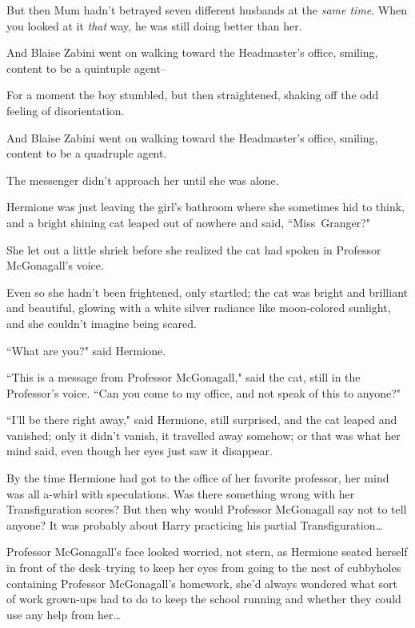 But then Mum hadn't betrayed seven different husbands at the \emph{same time}. When you looked at it \emph{that} way, he was still doing better than her.

And Blaise Zabini went on walking toward the Headmaster's office, smiling, content to be a quintuple agent\---

For a moment the boy stumbled, but then straightened, shaking off the odd feeling of disorientation.

And Blaise Zabini went on walking toward the Headmaster's office, smiling, content to be a quadruple agent.


The messenger didn't approach her until she was alone.

Hermione was just leaving the girl's bathroom where she sometimes hid to think, and a bright shining cat leaped out of nowhere and said, ``Miss~Granger?"

She let out a little shriek before she realized the cat had spoken in Professor McGonagall's voice.

Even so she hadn't been frightened, only startled; the cat was bright and brilliant and beautiful, glowing with a white silver radiance like moon-colored sunlight, and she couldn't imagine being scared.

``What are you?" said Hermione.

``This is a message from Professor McGonagall," said the cat, still in the Professor's voice. ``Can you come to my office, and not speak of this to anyone?"

``I'll be there right away," said Hermione, still surprised, and the cat leaped and vanished; only it didn't vanish, it travelled away somehow; or that was what her mind said, even though her eyes just saw it disappear.

By the time Hermione had got to the office of her favorite professor, her mind was all a-whirl with speculations. Was there something wrong with her Transfiguration scores? But then why would Professor McGonagall say not to tell anyone? It was probably about Harry practicing his partial Transfiguration{\ldots}

Professor McGonagall's face looked worried, not stern, as Hermione seated herself in front of the desk\---trying to keep her eyes from going to the nest of cubbyholes containing Professor McGonagall's homework, she'd always wondered what sort of work grown-ups had to do to keep the school running and whether they could use any help from her{\ldots}

